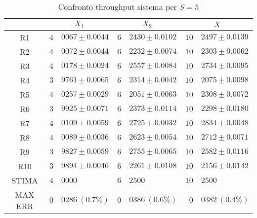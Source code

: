 \begin{table}[!h]
\begin{tabular}{c|r@{.}l|r@{.}l|r@{.}l}
& \multicolumn{2}{|c|}{$X_1$}
& \multicolumn{2}{|c|}{$X_2$}
& \multicolumn{2}{|c}{$X$} 
\\          
\hline
R1      & $4$&$0067 \pm 0.0044$ & $6$&$2430 \pm 0.0102$ & $10$&$2497 \pm 0.0139$ \\
R2      & $4$&$0072 \pm 0.0044$ & $6$&$2232 \pm 0.0074$ & $10$&$2303 \pm 0.0062$ \\
R3      & $4$&$0178 \pm 0.0024$ & $6$&$2557 \pm 0.0084$ & $10$&$2734 \pm 0.0095$ \\
R4      & $3$&$9761 \pm 0.0065$ & $6$&$2314 \pm 0.0042$ & $10$&$2075 \pm 0.0098$ \\
R5      & $4$&$0257 \pm 0.0029$ & $6$&$2051 \pm 0.0063$ & $10$&$2308 \pm 0.0072$ \\
R6      & $3$&$9925 \pm 0.0071$ & $6$&$2373 \pm 0.0114$ & $10$&$2298 \pm 0.0180$ \\
R7      & $4$&$0109 \pm 0.0059$ & $6$&$2725 \pm 0.0032$ & $10$&$2834 \pm 0.0048$ \\
R8      & $4$&$0089 \pm 0.0036$ & $6$&$2623 \pm 0.0054$ & $10$&$2712 \pm 0.0071$ \\
R9      & $3$&$9827 \pm 0.0059$ & $6$&$2755 \pm 0.0065$ & $10$&$2582 \pm 0.0116$ \\
R10     & $3$&$9894 \pm 0.0046$ & $6$&$2261 \pm 0.0108$ & $10$&$2156 \pm 0.0142$ \\
STIMA   & $4$&$0000$            & $6$&$2500$            & $10$&$2500$            \\
MAX ERR & $0$&$0286 \ (0.7\%)$  & $0$&$0386 \ (0.6\%)$  & $0$&$0382 \ (0.4\%)$     
\end{tabular}
\centering
\caption{Confronto throughput sistema per $S=5$}
\label{tab:5_x}
\end{table}
